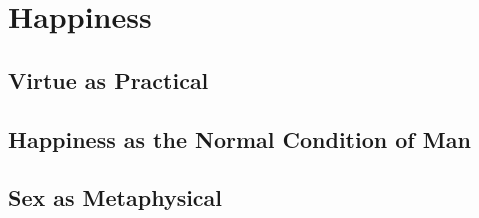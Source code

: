 \chapter{Happiness}

    \section{Virtue as Practical}

    \section{Happiness as the Normal Condition of Man}

    \section{Sex as Metaphysical}
